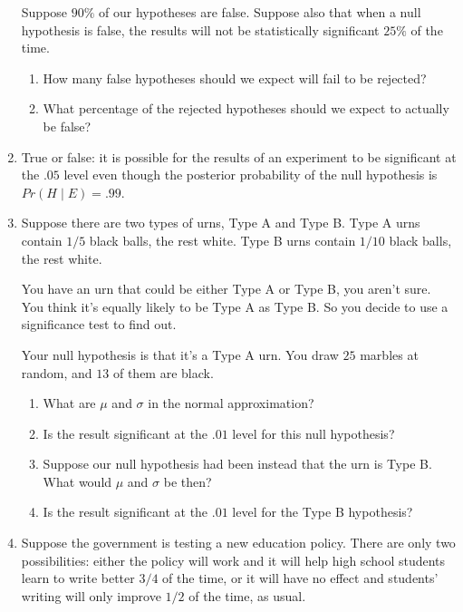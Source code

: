 \documentclass[justified]{tufte-book}
\providecommand{\tightlist}{%
  \setlength{\itemsep}{0pt}\setlength{\parskip}{0pt}}
\newcommand{\given}{\mid}
\newcommand{\p}{Pr}
\theoremstyle{definition}
\theoremstyle{definition}
\theoremstyle{definition}
\theoremstyle{remark}
\begin{document}
\begin{enumerate}
  Suppose \(90\%\) of our hypotheses are false. Suppose also that when a
  null hypothesis is false, the results will not be statistically
  significant \(25\%\) of the time.

  \begin{enumerate}
  \def\labelenumii{\alph{enumii}.}
  \tightlist
  \item
    How many false hypotheses should we expect will fail to be rejected?
  \item
    What percentage of the rejected hypotheses should we expect to
    actually be false?
  \end{enumerate}
\item
  True or false: it is possible for the results of an experiment to be
  significant at the \(.05\) level even though the posterior probability
  of the null hypothesis is \(\p(H \given E) = .99\).
\item
  Suppose there are two types of urns, Type A and Type B. Type A urns
  contain \(1/5\) black balls, the rest white. Type B urns contain
  \(1/10\) black balls, the rest white.

  You have an urn that could be either Type A or Type B, you aren't
  sure. You think it's equally likely to be Type A as Type B. So you
  decide to use a significance test to find out.

  Your null hypothesis is that it's a Type A urn. You draw \(25\)
  marbles at random, and \(13\) of them are black.

  \begin{enumerate}
  \def\labelenumii{\alph{enumii}.}
  \tightlist
  \item
    What are \(\mu\) and \(\sigma\) in the normal approximation?
  \item
    Is the result significant at the \(.01\) level for this null
    hypothesis?
  \item
    Suppose our null hypothesis had been instead that the urn is Type B.
    What would \(\mu\) and \(\sigma\) be then?
  \item
    Is the result significant at the \(.01\) level for the Type B
    hypothesis?
  \end{enumerate}
\item
  Suppose the government is testing a new education policy. There are
  only two possibilities: either the policy will work and it will help
  high school students learn to write better \(3/4\) of the time, or it
  will have no effect and students' writing will only improve \(1/2\) of
  the time, as usual.


\end{enumerate}
\end{document}
